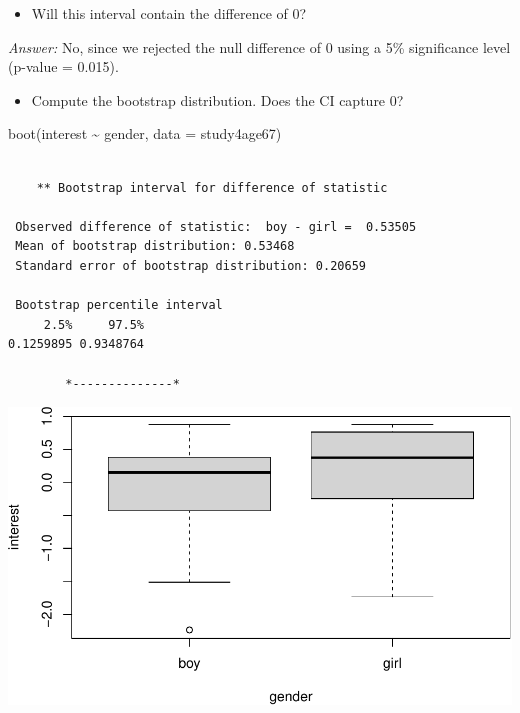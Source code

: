 \documentclass[
]{book}
\newenvironment{Shaded}{\begin{snugshade}}{\end{snugshade}}
\newcommand{\AttributeTok}[1]{\textcolor[rgb]{0.77,0.63,0.00}{#1}}
\newcommand{\FunctionTok}[1]{\textcolor[rgb]{0.00,0.00,0.00}{#1}}
\newcommand{\NormalTok}[1]{#1}
\newcommand{\SpecialCharTok}[1]{\textcolor[rgb]{0.00,0.00,0.00}{#1}}
\providecommand{\tightlist}{%
  \setlength{\itemsep}{0pt}\setlength{\parskip}{0pt}}
\begin{document}
\begin{itemize}
\tightlist
\item
  Will this interval contain the difference of 0?
\end{itemize}

\emph{Answer:} No, since we rejected the null difference of 0 using a 5\% significance level (p-value = 0.015).

\vspace*{.5in}

\begin{itemize}
\tightlist
\item
  Compute the bootstrap distribution. Does the CI capture 0?
\end{itemize}

\begin{Shaded}
\begin{Highlighting}[]
\FunctionTok{boot}\NormalTok{(interest }\SpecialCharTok{\textasciitilde{}}\NormalTok{ gender, }\AttributeTok{data =}\NormalTok{ study4age67)}
\end{Highlighting}
\end{Shaded}

\begin{verbatim}

    ** Bootstrap interval for difference of statistic

 Observed difference of statistic:  boy - girl =  0.53505 
 Mean of bootstrap distribution: 0.53468 
 Standard error of bootstrap distribution: 0.20659 

 Bootstrap percentile interval
     2.5%     97.5% 
0.1259895 0.9348764 

        *--------------*
\end{verbatim}

\includegraphics[width=1\linewidth]{Class_Activity_14_files/figure-latex/unnamed-chunk-10-1}
\end{document}
